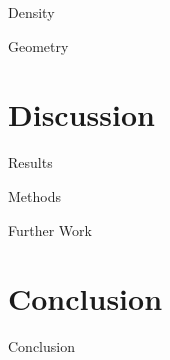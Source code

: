 \documentclass[aspectratio=169,hyperref={pdfpagelabels=false}]{beamer}
\begin{document}
\begin{frame}{Density} %
    
\end{frame}
\note{

}


\begin{frame}{Geometry} %
    
\end{frame}
\note{

}


\section{Discussion} %
\begin{frame}{Results} %
    
\end{frame}
\note{

}


\begin{frame}{Methods} %
    
\end{frame}
\note{

}


\begin{frame}{Further Work} %

\end{frame}
\note{

}


\section{Conclusion} %
\begin{frame}{Conclusion} %
    
\end{frame}
\note{

}
\end{document}
